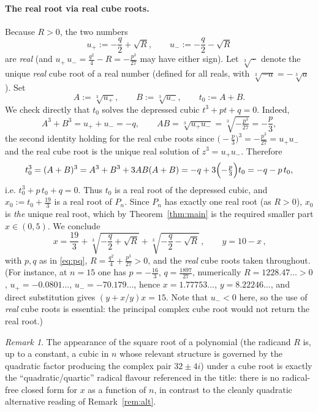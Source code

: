 \documentclass{amsart}
\theoremstyle{remark}
\newtheorem{remark}{Remark}
\begin{document}
\paragraph{The real root via real cube roots.}
Because $R>0$, the two numbers
\[
u_+:=-\frac{q}{2}+\sqrt{R},\qquad u_-:=-\frac{q}{2}-\sqrt{R}
\]
are \emph{real} (and $u_+\,u_-=\tfrac{q^2}{4}-R=-\tfrac{p^3}{27}$ may have either
sign). Let $\sqrt[3]{\,\cdot\,}$ denote the unique \emph{real} cube root of a
real number (defined for all reals, with $\sqrt[3]{-a}=-\sqrt[3]{a}$). Set
\[
A:=\sqrt[3]{u_+},\qquad B:=\sqrt[3]{u_-},\qquad t_0:=A+B .
\]
We check directly that $t_0$ solves the depressed cubic $t^3+pt+q=0$. Indeed,
\[
A^3+B^3=u_++u_-=-q,\qquad
AB=\sqrt[3]{u_+u_-}=\sqrt[3]{-\tfrac{p^3}{27}}=-\frac{p}{3},
\]
the second identity holding for the real cube roots since
$\bigl(-\tfrac{p}{3}\bigr)^3=-\tfrac{p^3}{27}=u_+u_-$ and the real cube root is
the unique real solution of $z^3=u_+u_-$. Therefore
\[
t_0^{3}=(A+B)^3=A^3+B^3+3AB(A+B)=-q+3\Bigl(-\tfrac{p}{3}\Bigr)t_0=-q-p\,t_0,
\]
i.e. $t_0^{3}+p\,t_0+q=0$. Thus $t_0$ is a real root of the depressed cubic, and
$x_0:=t_0+\tfrac{19}{3}$ is a real root of $P_n$. Since $P_n$ has exactly one
real root (as $R>0$), $x_0$ is \emph{the} unique real root, which by
Theorem~\ref{thm:main} is the required smaller part $x\in(0,5)$. We conclude
\begin{equation}\label{eq:cardano}
\boxed{\,x=\frac{19}{3}
   +\sqrt[3]{-\frac{q}{2}+\sqrt{R}}
   +\sqrt[3]{-\frac{q}{2}-\sqrt{R}}\,,
\qquad y=10-x\,,}
\end{equation}
with $p,q$ as in \eqref{eq:pq}, $R=\frac{q^2}{4}+\frac{p^3}{27}>0$, and the
\emph{real} cube roots taken throughout. (For instance, at $n=15$ one has
$p=-\tfrac{16}{3}$, $q=\tfrac{1897}{27}$, numerically
$R=1228.47\ldots>0$, $u_+=-0.0801\ldots$, $u_-=-70.179\ldots$, hence
$x=1.77753\ldots$, $y=8.22246\ldots$, and direct substitution gives
$(y+x/y)x=15$. Note that $u_-<0$ here, so the use of \emph{real} cube roots is
essential: the principal complex cube root would not return the real root.)

\begin{remark}
The appearance of the square root of a polynomial (the radicand $R$ is, up to a
constant, a cubic in $n$ whose relevant structure is governed by the quadratic
factor producing the complex pair $32\pm4i$) under a cube root is exactly the
``quadratic/quartic'' radical flavour referenced in the title: there is no
radical-free closed form for $x$ as a function of $n$, in contrast to the
cleanly quadratic alternative reading of Remark~\ref{rem:alt}.
\end{remark}
\end{document}
